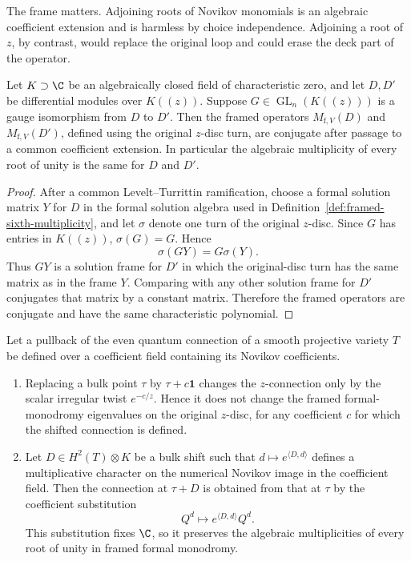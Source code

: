 The frame matters.  Adjoining roots of Novikov monomials is an algebraic
coefficient extension and is harmless by choice independence.  Adjoining a root of
\(z\), by contrast, would replace the original loop and could erase the deck
part of the operator.

\begin{lemmaOneA}
\label{lem:frame-transport}
Let \(K\supset\C\) be an algebraically closed field of characteristic zero,
and let \(D,D'\) be differential modules over \(K(\!(z)\!)\).  Suppose
\(G\in\operatorname{GL}_n(K(\!(z)\!))\) is a gauge isomorphism from \(D\) to
\(D'\).  Then the framed operators \(M_{\mathrm f,V}(D)\) and
\(M_{\mathrm f,V}(D')\), defined using the original \(z\)-disc turn, are
conjugate after passage to a common coefficient extension.  In particular the
algebraic multiplicity of every root of unity is the same for \(D\) and
\(D'\).
\end{lemmaOneA}

\begin{proof}
After a common Levelt--Turrittin ramification, choose a formal solution matrix
\(Y\) for \(D\) in the formal solution algebra used in
Definition~\ref{def:framed-sixth-multiplicity}, and let \(\sigma\) denote one
turn of the original \(z\)-disc.  Since \(G\) has entries in
\(K(\!(z)\!)\), \(\sigma(G)=G\).  Hence
\[
 \sigma(GY)=G\sigma(Y).
\]
Thus \(GY\) is a solution frame for \(D'\) in which the original-disc turn has
the same matrix as in the frame \(Y\).  Comparing with any other solution frame
for \(D'\) conjugates that matrix by a constant matrix.  Therefore the framed
operators are conjugate and have the same characteristic polynomial.
\end{proof}

\begin{lemma}
\label{lem:exact-low-degree-shifts}
%
%
%
Let a pullback of the even quantum connection of a smooth projective
variety $T$ be defined over a coefficient field containing its Novikov
coefficients.
\begin{enumerate}[label=(\roman*)]
\item Replacing a bulk point $\tau$ by $\tau+c\mathbf 1$ changes the
$z$-connection only by the scalar irregular twist $e^{-c/z}$.  Hence it does
not change the framed formal-monodromy eigenvalues on the original
$z$-disc, for any coefficient $c$ for which the shifted connection is
defined.
\item Let $D\in H^2(T)\otimes K$ be a bulk shift such that
$d\mapsto e^{\langle D,d\rangle}$ defines a multiplicative character on
the numerical Novikov image in the coefficient field.  Then the connection
at $\tau+D$ is obtained from that at $\tau$ by the coefficient
substitution
\[
 Q^d\longmapsto e^{\langle D,d\rangle}Q^d.
\]
This substitution fixes $\C$, so it preserves the algebraic
multiplicities of every root of unity in framed formal monodromy.
\end{enumerate}
\end{lemma}

